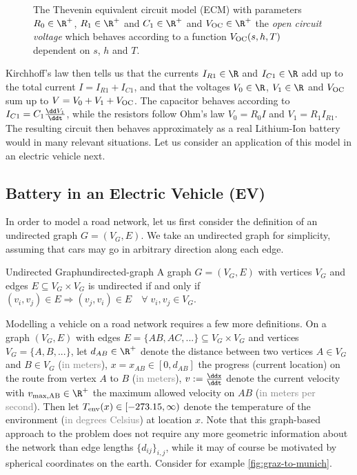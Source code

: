 \documentclass{prettytex/ox/mmsc-special-topic}
\begin{document}
  \begin{figure}[H]
    \centering
    \caption{
      The Thevenin equivalent circuit model (ECM) with parameters $R_0 \in \R^+$, $R_1 \in \R^+$ and $C_1 \in \R^+$ and $V_{\rm OC} \in \R^+$ the \textit{open circuit voltage} which behaves according to a function $V_{\rm OC}(s, h, T)$ dependent on $s$, $h$ and $T$.
    }
    \label{fig:ecm}
  \end{figure}

  Kirchhoff's law then tells us that the currents $I_{R1} \in \R$ and $I_{C1} \in \R$ add up to the total current $I = I_{R1} + I_{C1}$, and that the voltages $V_0 \in \R$, $V_1 \in \R$ and $V_{\rm OC}$ sum up to $V = V_0 + V_1 + V_{\rm OC}$.
  The capacitor behaves according to $I_{C1} = C_1 \frac{\dd V_1}{\ddt}$, while the resistors follow Ohm's law $V_0 = R_0 I$ and $V_1 = R_1 I_{R1}$.
  The resulting circuit then behaves approximately as a real Lithium-Ion battery would in many relevant situations.
  Let us consider an application of this model in an electric vehicle next.

  \subsection{Battery in an Electric Vehicle (EV)}
  In order to model a road network, let us first consider the definition of an undirected graph $G = (V_G, E)$. We take an undirected graph for simplicity, assuming that cars may go in arbitrary direction along each edge.
  \begin{definition}{Undirected Graph}{undirected-graph}
    A graph $G = (V_G, E)$ with vertices $V_G$ and edges $E \subseteq V_G \times V_G$ is undirected if and only if $(v_i, v_j) \in E \Rightarrow (v_j, v_i) \in E \quad \forall\; v_i, v_j \in V_G$.
  \end{definition}

  Modelling a vehicle on a road network requires a few more definitions.
  On a graph $(V_G, E)$ with edges $E = \{AB, AC, ...\} \subseteq V_G \times V_G$ and vertices $V_G = \{A, B, ...\}$, let
  $d_{AB} \in \R^+$ denote the distance between two vertices $A \in V_G$ and $B \in V_G$ (\textcolor{gray}{in meters}),
  $x = x_{AB} \in [0, d_{AB}]$ the progress (current location) on the route from vertex $A$ to $B$ (\textcolor{gray}{in meters}),
  $v := \frac{\ddx}{\ddt}$ denote the current velocity with
  $v_{\rm max, AB} \in \R^+$ the maximum allowed velocity on $AB$ (\textcolor{gray}{in meters per second}).
  Then let
  $T_{\rm env}(x) \in [-273.15, \infty)$ denote the temperature of the environment (\textcolor{gray}{in degrees Celsius}) at location $x$.
  Note that this graph-based approach to the problem does not require any more geometric information about the network than edge lengths $\{d_{ij}\}_{i,j}$, while it may of course be motivated by spherical coordinates on the earth.
  Consider for example \autoref{fig:graz-to-munich}.
\end{document}
